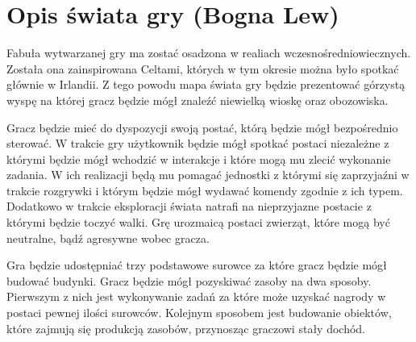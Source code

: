 \section{Opis świata gry (Bogna Lew)}
Fabuła wytwarzanej gry ma zostać osadzona w realiach wczesnośredniowiecznych. Została ona zainspirowana Celtami, których
w tym okresie można było spotkać głównie w Irlandii. Z tego powodu mapa świata gry będzie prezentować górzystą wyspę na
której gracz będzie mógł znaleźć niewielką wioskę oraz obozowiska.

Gracz będzie mieć do dyspozycji swoją postać, którą będzie mógł bezpośrednio sterować. W trakcie gry użytkownik będzie
mógł spotkać postaci niezależne z którymi będzie mógł wchodzić w interakcje i które mogą mu zlecić wykonanie zadania.
W ich realizacji będą mu pomagać jednostki z którymi się zaprzyjaźni w trakcie rozgrywki i którym będzie mógł wydawać
komendy zgodnie z ich typem. Dodatkowo w trakcie eksploracji świata natrafi na nieprzyjazne postacie z którymi
będzie toczyć walki. Grę urozmaicą postaci zwierząt, które mogą być neutralne, bądź agresywne wobec gracza.

Gra będzie udostępniać trzy podstawowe surowce za które gracz będzie mógł budować budynki. Gracz będzie mógł pozyskiwać
zasoby na dwa sposoby. Pierwszym z nich jest wykonywanie zadań za które może uzyskać nagrody w postaci pewnej ilości
surowców. Kolejnym sposobem jest budowanie obiektów, które zajmują się produkcją zasobów, przynosząc graczowi stały
dochód.
